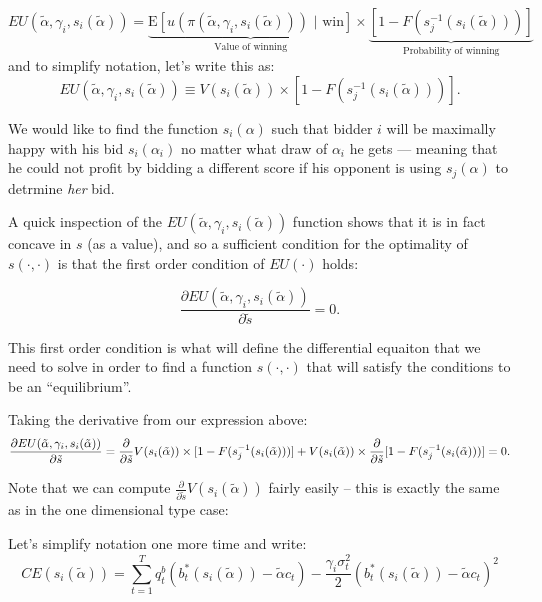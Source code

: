 \documentclass[
]{article}
\begin{document}
\[
EU(\tilde{\alpha}, {\gamma_i}, s_{i}(\tilde{\alpha})) = \underbrace{\text{E}[u(\pi(\tilde{\alpha}, {\gamma_i}, s_{i}(\tilde{\alpha}))) \text{ | win}] }_{\text{Value of winning}} \times \underbrace{[1 - F(s_{j}^{-1}(s_{i}(\tilde{\alpha}))) ]}_{\text{Probability of winning}} 
\] and to simplify notation, let's write this as: \[
EU(\tilde{\alpha}, {\gamma_i}, s_{i}(\tilde{\alpha})) \equiv V(s_{i}(\tilde{\alpha})) \times [1 - F(s_{j}^{-1}(s_{i}(\tilde{\alpha}))) ].
\]

We would like to find the function \(s_{i}(\alpha)\) such that bidder
\(i\) will be maximally happy with his bid \(s_{i}({\alpha_i})\) no
matter what draw of \(\alpha_i\) he gets --- meaning that he could not
profit by bidding a different score if his opponent is using
\(s_{j}(\alpha)\) to detrmine \emph{her} bid.

A quick inspection of the
\(EU(\tilde{\alpha}, {\gamma_i}, s_{i}(\tilde{\alpha}))\) function shows
that it is in fact concave in \(s\) (as a value), and so a sufficient
condition for the optimality of \(s(\cdot, \cdot)\) is that the first
order condition of \(EU(\cdot)\) holds:

\[
\frac{\partial EU(\tilde{\alpha}, {\gamma}_i, s_{i}(\tilde{\alpha}))}{\partial \tilde{s}} = 0.
\]

This first order condition is what will define the differential equaiton
that we need to solve in order to find a function \(s(\cdot, \cdot)\)
that will satisfy the conditions to be an ``equilibrium''.

Taking the derivative from our expression above: 
\begin{equation}\label{foc}
\frac{\partial EU(\tilde{\alpha}, {\gamma}_i, s_{i}(\tilde{\alpha}))}{\partial \tilde{s}}  =  
\frac{\partial}{\partial \tilde{s}}V(s_{i}(\tilde{\alpha}))  \times [1 - F(s_{j}^{-1}(s_{i}(\tilde{\alpha}))) ] + V(s_{i}(\tilde{\alpha})) \times \frac{\partial}{\partial \tilde{s}}[1 - F(s_{j}^{-1}(s_{i}(\tilde{\alpha}))) ]
\\
= 0.
\end{equation}

Note that we can compute
\(\frac{\partial}{\partial \tilde{s}}V(s_{i}(\tilde{\alpha}))\) fairly
easily -- this is exactly the same as in the one dimensional type case:

Let's simplify notation one more time and write: \[
CE(s_{i}(\tilde{\alpha})) = \sum_{t=1}^{T} q_{t}^{b}\left(b_{t}^{*}(s_{i}(\tilde{\alpha}))-\tilde{\alpha} c_{t}\right)-\frac{{\gamma_i} \sigma_{t}^{2}}{2}\left(b_{t}^{*}(s_{i}(\tilde{\alpha}))-\tilde{\alpha} c_{t}\right)^{2}
\]
\end{document}
